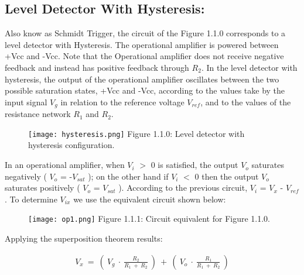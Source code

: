 \pagebreak

\subsection{Level Detector With Hysteresis:}

Also know as Schmidt Trigger, the circuit of the Figure 1.1.0 corresponds to a level detector with Hysteresis. The operational amplifier is powered between +Vcc and -Vcc. Note that the Operational amplifier does not receive negative feedback and instead has positive feedback through $R_{2}$. In the level detector with hysteresis, the output of the operational amplifier oscillates between the two possible saturation states, +Vcc and -Vcc, according to the values take by the input signal $V_{g}$ in relation to the reference voltage $V_{ref}$, and to the values ​​of the resistance network $R_{1}$ and $R_{2}$. \hfill \break

\begin{figure}[H]
\texttt{[image: hysteresis.png]}
\centering \linebreak \linebreak Figure 1.1.0: Level detector with hysteresis configuration.
\end{figure} \hfill

In an operational amplifier, when $V_{i}$ $>$ 0 is satisfied, the output $V_{o}$ saturates negatively ( $V_{o}$ = -$V_{sat}$ ); on the other hand if $V_{i}$ $<$ 0 then the output $V_{o}$ saturates positively ( $V_{o}$ = $V_{sat}$ ). According to the previous circuit, $V_{i}$ = $V_{x}$ - $V_{ref}$. To determine $V_{ix}$ we use the equivalent circuit shown below: \hfill \break

\begin{figure}[H]
\texttt{[image: op1.png]}
\centering \linebreak \linebreak Figure 1.1.1: Circuit equivalent for Figure 1.1.0.
\end{figure} \hfill

Applying the superposition theorem results:

\begin{ceqn}
\begin{align*}
V_{x}\ =\ (\ V_{g}\ \cdot\ \frac{R_{2}}{R_{1}\ +\ R_{2}}\ )\ +\ (\ V_{o}\ \cdot\ \frac{R_{1}}{R_{1}\ +\ R_{2}}\ )
\end{align*}
\end{ceqn} \hfill

